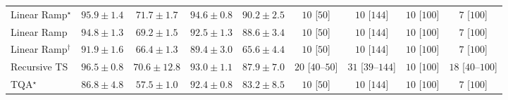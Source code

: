 \begin{tabular}{l|cccc|cccc|}
Linear Ramp$^\star$ & {\cellcolor[HTML]{732905}} \color[HTML]{F1F1F1} $95.9\pm 1.4$ & {\cellcolor[HTML]{FEB13E}} \color[HTML]{000000} $71.7\pm 1.7$ & {\cellcolor[HTML]{7E2C05}} \color[HTML]{F1F1F1} $94.6\pm 0.8$ & {\cellcolor[HTML]{A63A03}} \color[HTML]{F1F1F1} $90.2\pm 2.5$ & {\cellcolor[HTML]{FFF6F2}} \color[HTML]{000000} $10$ [$50$] & {\cellcolor[HTML]{FFF6F2}} \color[HTML]{000000} $10$ [$144$] & {\cellcolor[HTML]{FFF6F2}} \color[HTML]{000000} $10$ [$100$] & {\cellcolor[HTML]{FFF6F2}} \color[HTML]{000000} $7$ [$100$] \\
Linear Ramp & {\cellcolor[HTML]{7C2C05}} \color[HTML]{F1F1F1} $94.8\pm 1.3$ & {\cellcolor[HTML]{FEC550}} \color[HTML]{000000} $69.2\pm 1.5$ & {\cellcolor[HTML]{913204}} \color[HTML]{F1F1F1} $92.5\pm 1.3$ & {\cellcolor[HTML]{B44103}} \color[HTML]{F1F1F1} $88.6\pm 3.4$ & {\cellcolor[HTML]{FFF6F2}} \color[HTML]{000000} $10$ [$50$] & {\cellcolor[HTML]{FFF6F2}} \color[HTML]{000000} $10$ [$144$] & {\cellcolor[HTML]{FFF6F2}} \color[HTML]{000000} $10$ [$100$] & {\cellcolor[HTML]{FFF6F2}} \color[HTML]{000000} $7$ [$100$] \\
Linear Ramp$^\dagger$ & {\cellcolor[HTML]{983404}} \color[HTML]{F1F1F1} $91.9\pm 1.6$ & {\cellcolor[HTML]{FED36F}} \color[HTML]{000000} $66.4\pm 1.3$ & {\cellcolor[HTML]{AE3E03}} \color[HTML]{F1F1F1} $89.4\pm 3.0$ & {\cellcolor[HTML]{FED87A}} \color[HTML]{000000} $65.6\pm 4.4$ & {\cellcolor[HTML]{FFF6F2}} \color[HTML]{000000} $10$ [$50$] & {\cellcolor[HTML]{FFF6F2}} \color[HTML]{000000} $10$ [$144$] & {\cellcolor[HTML]{FFF6F2}} \color[HTML]{000000} $10$ [$100$] & {\cellcolor[HTML]{FFF6F2}} \color[HTML]{000000} $7$ [$100$] \\
Recursive TS & {\cellcolor[HTML]{6E2706}} \color[HTML]{F1F1F1} $96.5\pm 0.8$ & {\cellcolor[HTML]{FEBA46}} \color[HTML]{000000} $70.6\pm 12.8$ & {\cellcolor[HTML]{8C3004}} \color[HTML]{F1F1F1} $93.0\pm 1.1$ & {\cellcolor[HTML]{BB4403}} \color[HTML]{F1F1F1} $87.9\pm 7.0$ & {\cellcolor[HTML]{FFF3EF}} \color[HTML]{000000} $20$ [$40$--$50$] & {\cellcolor[HTML]{FEF1ED}} \color[HTML]{000000} $31$ [$39$--$144$] & {\cellcolor[HTML]{FFF6F2}} \color[HTML]{000000} $10$ [$100$] & {\cellcolor[HTML]{FFF3F0}} \color[HTML]{000000} $18$ [$40$--$100$] \\
TQA$^\star$ & {\cellcolor[HTML]{C64902}} \color[HTML]{F1F1F1} $86.8\pm 4.8$ & {\cellcolor[HTML]{FFF8C0}} \color[HTML]{000000} $57.5\pm 1.0$ & {\cellcolor[HTML]{933204}} \color[HTML]{F1F1F1} $92.4\pm 0.8$ & {\cellcolor[HTML]{DC5E0B}} \color[HTML]{F1F1F1} $83.2\pm 8.5$ & {\cellcolor[HTML]{FFF6F2}} \color[HTML]{000000} $10$ [$50$] & {\cellcolor[HTML]{FFF6F2}} \color[HTML]{000000} $10$ [$144$] & {\cellcolor[HTML]{FFF6F2}} \color[HTML]{000000} $10$ [$100$] & {\cellcolor[HTML]{FFF6F2}} \color[HTML]{000000} $7$ [$100$] \\

\end{tabular}
